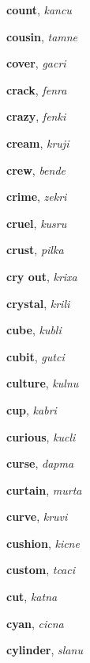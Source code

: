 \documentclass[12pt]{book}
\begin{document}
\begin{description}
\item[ ] \textbf{count}, \textit{kancu}

\item[ ] \textbf{cousin}, \textit{tamne}

\item[ ] \textbf{cover}, \textit{gacri}

\item[ ] \textbf{crack}, \textit{fenra}

\item[ ] \textbf{crazy}, \textit{fenki}

\item[ ] \textbf{cream}, \textit{kruji}

\item[ ] \textbf{crew}, \textit{bende}

\item[ ] \textbf{crime}, \textit{zekri}

\item[ ] \textbf{cruel}, \textit{kusru}

\item[ ] \textbf{crust}, \textit{pilka}

\item[ ] \textbf{cry out}, \textit{krixa}

\item[ ] \textbf{crystal}, \textit{krili}

\item[ ] \textbf{cube}, \textit{kubli}

\item[ ] \textbf{cubit}, \textit{gutci}

\item[ ] \textbf{culture}, \textit{kulnu}

\item[ ] \textbf{cup}, \textit{kabri}

\item[ ] \textbf{curious}, \textit{kucli}

\item[ ] \textbf{curse}, \textit{dapma}

\item[ ] \textbf{curtain}, \textit{murta}

\item[ ] \textbf{curve}, \textit{kruvi}

\item[ ] \textbf{cushion}, \textit{kicne}

\item[ ] \textbf{custom}, \textit{tcaci}

\item[ ] \textbf{cut}, \textit{katna}

\item[ ] \textbf{cyan}, \textit{cicna}

\item[ ] \textbf{cylinder}, \textit{slanu}



\end{description}
\end{document}
